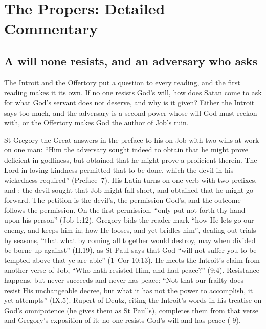 
\section{The Propers: Detailed Commentary}

\subsection{A will none resists, and an adversary who asks}

The Introit and the Offertory put a question to every reading, and the first
reading makes it its own. If no one resists God's will, how does Satan come to
ask for what God's servant does not deserve, and why is it given? Either the
Introit says too much, and the adversary is a second power whose will God must
reckon with, or the Offertory makes God the author of Job's ruin.

St Gregory the Great answers in the preface to his  on Job with two
wills at work on one man: ``Him the adversary sought indeed to obtain that he
might prove deficient in godliness, but obtained that he might prove a
proficient therein. The Lord in loving-kindness permitted that to be done, which
the devil in his wickedness required'' (Preface~7). His Latin turns on one verb
with two prefixes,  and : the devil
sought that Job might fall short, and obtained that he might go forward. The
petition is the devil's, the permission God's, and the outcome follows the
permission. On the first permission, ``only put not forth thy hand upon his
person'' (Job 1:12), Gregory bids the reader mark ``how He lets go our enemy,
and keeps him in; how He looses, and yet bridles him'', dealing out trials by
seasons, ``that what by coming all together would destroy, may when divided be
borne up against'' (II.19), as St Paul says that God ``will not suffer you to be
tempted above that ye are able'' (1~Cor 10:13). He meets the Introit's claim from
another verse of Job, ``Who hath resisted Him, and had peace?'' (9:4).
Resistance happens, but never succeeds and never has peace: ``Not that our
frailty does resist His unchangeable decree, but what it has not the power to
accomplish, it yet attempts'' (IX.5). Rupert of Deutz, citing the Introit's
words in his treatise on God's omnipotence (he gives them as St Paul's), completes them from that verse and
Gregory's exposition of it: no one resists God's will and has peace ( 9).

